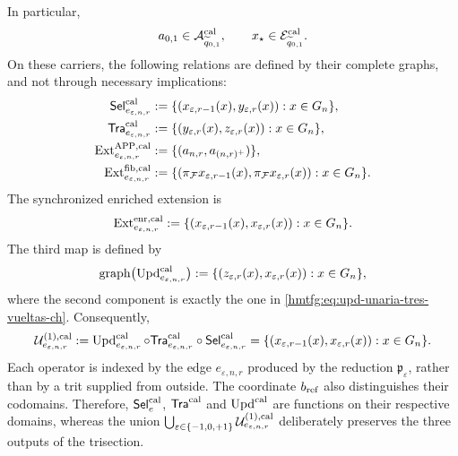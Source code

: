 In particular,
\[
 a_{0,1}\in\mathcal A^{\rm cal}_{\widetilde q_{0,1}},
 \qquad
 x_\star\in\mathcal E^{\rm cal}_{\widetilde q_{0,1}}.
\]
On these carriers, the following relations are defined by their complete
graphs, and not through necessary implications:
\begin{align}
 \mathsf{Sel}^{\rm cal}_{e_{\varepsilon,n,r}}
   &:=\{(x_{\varepsilon,r-1}(x),y_{\varepsilon,r}(x)):
          x\in G_n\},\\
 \mathsf{Tra}^{\rm cal}_{e_{\varepsilon,n,r}}
   &:=\{(y_{\varepsilon,r}(x),z_{\varepsilon,r}(x)):
          x\in G_n\},\\
 \operatorname{Ext}^{\mathrm{APP},\rm cal}_{e_{\varepsilon,n,r}}
   &:=\{(a_{n,r},a_{(n,r)^+})\},
 \label{hmtfg:eq:ext-app-calibrada-ch}\\
 \operatorname{Ext}^{\rm fib,cal}_{e_{\varepsilon,n,r}}
   &:=\{(\pi_{\mathcal F}x_{\varepsilon,r-1}(x),
          \pi_{\mathcal F}x_{\varepsilon,r}(x)):x\in G_n\}.
 \label{hmtfg:eq:ext-fibra-calibrada-ch}
\end{align}
The synchronized enriched extension is
\begin{equation}
 \operatorname{Ext}^{\rm enr,cal}_{e_{\varepsilon,n,r}}
 :=\{(x_{\varepsilon,r-1}(x),x_{\varepsilon,r}(x)):
       x\in G_n\}.
 \label{hmtfg:eq:ext-enriquecida-calibrada-ch}
\end{equation}
The third map is defined by
\begin{equation}
 \operatorname{graph}
 \bigl(\operatorname{Upd}^{\rm cal}_{e_{\varepsilon,n,r}}\bigr)
 :=\{(z_{\varepsilon,r}(x),x_{\varepsilon,r}(x)):
       x\in G_n\},
 \label{hmtfg:eq:grafo-upd-calibrado-ch}
\end{equation}
where the second component is exactly the one in
\eqref{hmtfg:eq:upd-unaria-tres-vueltas-ch}. Consequently,
\begin{equation}
 \mathcal U^{(1),\rm cal}_{e_{\varepsilon,n,r}}
 :=\operatorname{Upd}^{\rm cal}_{e_{\varepsilon,n,r}}\circ
   \mathsf{Tra}^{\rm cal}_{e_{\varepsilon,n,r}}\circ
   \mathsf{Sel}^{\rm cal}_{e_{\varepsilon,n,r}}
 =\{(x_{\varepsilon,r-1}(x),x_{\varepsilon,r}(x)):
      x\in G_n\}.
 \label{hmtfg:eq:transicion-cal-en-tpk-ch}
\end{equation}
Each operator is indexed by the edge \(e_{\varepsilon,n,r}\) produced by the
reduction \(\mathfrak p_\varepsilon\), rather than by a trit supplied from
outside. The coordinate \(b_{\rm ref}\) also distinguishes their codomains.
Therefore,
\(\mathsf{Sel}^{\rm cal}_{e}\),
\(\mathsf{Tra}^{\rm cal}\) and \(\operatorname{Upd}^{\rm cal}\) are functions
on their respective domains, whereas the union
\(\bigcup_{\varepsilon\in\{-1,0,+1\}}
\mathcal U^{(1),\rm cal}_{e_{\varepsilon,n,r}}\) deliberately preserves the
three outputs of the trisection.

